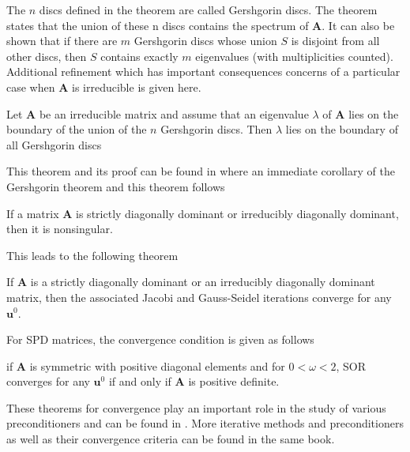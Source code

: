 The $n$ discs defined in the theorem are called Gershgorin discs. The theorem states that the union of these n discs contains the spectrum of $\boldsymbol{A}$. It can also be shown that if there are $m$ Gershgorin discs whose union $S$ is disjoint from all other discs, then $S$ contains exactly $m$ eigenvalues (with multiplicities counted). 
Additional refinement which has important consequences concerns of a particular case when $\boldsymbol{A}$ is irreducible is given here.
\begin{theorem}
Let $\boldsymbol{A}$ be an irreducible matrix and assume that an eigenvalue $\lambda$ of $\boldsymbol{A}$ lies on the boundary of the union of the $n$ Gershgorin discs. Then $\lambda$ lies on the boundary of all Gershgorin discs
\end{theorem}
This theorem and its proof can be found in \citep{doi:10.1137/1.9780898718003} where an immediate corollary of the Gershgorin theorem and this theorem follows
\begin{corollary}
If a matrix $\boldsymbol{A}$ is strictly diagonally dominant or irreducibly diagonally dominant, then it is nonsingular.
\end{corollary}
This leads to the following theorem
\begin{theorem}
If $\boldsymbol{A}$ is a strictly diagonally dominant or an irreducibly diagonally dominant matrix, then the associated Jacobi and Gauss-Seidel iterations converge for any $\boldsymbol{u}^0$.
\end{theorem}
For SPD matrices, the convergence condition is given as follows
\begin{theorem}
if $\boldsymbol{A}$ is symmetric with positive diagonal elements and for $0 < \omega < 2$, SOR converges for any $\boldsymbol{u}^0$ if and only if $\boldsymbol{A}$ is positive definite. 
\end{theorem}
These theorems for convergence play an important role in the study of various preconditioners and can be found in \citep{doi:10.1137/1.9780898718003}.
More iterative methods and preconditioners as well as their convergence criteria can be found in the same book.